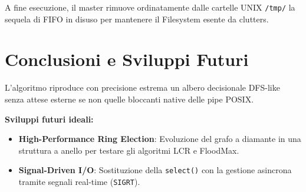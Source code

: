 \documentclass[a4paper,12pt]{article}
\begin{document}
A fine esecuzione, il master rimuove ordinatamente dalle cartelle UNIX \texttt{/tmp/} la sequela di FIFO in disuso per mantenere il Filesystem esente da clutters.

\section{Conclusioni e Sviluppi Futuri}
L'algoritmo riproduce con precisione estrema un albero decisionale DFS-like senza attese esterne se non quelle bloccanti native delle pipe POSIX.

\noindent \textbf{Sviluppi futuri ideali:}
\begin{itemize}
    \item \textbf{High-Performance Ring Election}: Evoluzione del grafo a diamante in una struttura a anello per testare gli algoritmi LCR e FloodMax.
    \item \textbf{Signal-Driven I/O}: Sostituzione della \texttt{select()} con la gestione asincrona tramite segnali real-time (\texttt{SIGRT}).
\end{itemize}
\end{document}
